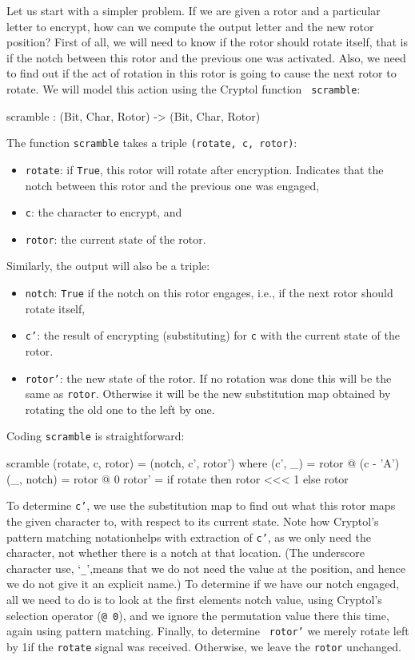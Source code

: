 Let us start with a simpler problem.  If we are given a rotor and a
particular letter to encrypt, how can we compute the output letter and
the new rotor position?  First of all, we will need to know if the
rotor should rotate itself, that is if the notch between this rotor
and the previous one was activated. Also, we need to find out if the
act of rotation in this rotor is going to cause the next rotor to
rotate. We will model this action using the Cryptol function {\tt
  scramble}:
\begin{code}
  scramble : (Bit, Char, Rotor) -> (Bit, Char, Rotor)
\end{code}
The function {\tt scramble} takes a triple \texttt{(rotate, c, rotor)}:
\begin{itemize}
\item {\tt rotate}: if {\tt True}, this rotor will rotate after
  encryption. Indicates that the notch between this rotor and the
  previous one was engaged,
  \item {\tt c}: the character to encrypt, and
  \item {\tt rotor}: the current state of the rotor.
\end{itemize}
Similarly, the output will also be a triple:
\begin{itemize}
\item {\tt notch}: {\tt True} if the notch on this rotor engages,
  i.e., if the next rotor should rotate itself,
\item {\tt c'}: the result of encrypting (substituting) for {\tt c}
  with the current state of the rotor.
\item {\tt rotor'}: the new state of the rotor. If no rotation was
  done this will be the same as {\tt rotor}. Otherwise it will be the
  new substitution map obtained by rotating the old one to the left by
  one.
\end{itemize}
Coding {\tt scramble} is straightforward:
\begin{code}
  scramble (rotate, c, rotor) = (notch, c', rotor')
    where 
      (c', _)    = rotor @ (c - 'A')
      (_, notch) = rotor @ 0
      rotor'     = if rotate then rotor <<< 1 else rotor
\end{code}
To determine {\tt c'}, we use the substitution map to find out what
this rotor maps the given character to, with respect to its current
state. Note how Cryptol's pattern matching notation\indPatMatch helps
with extraction of {\tt c'}, as we only need the character, not
whether there is a notch at that location.  (The underscore character
use, `\texttt{\_}',\indUnderscore means that we do not need the value
at the position, and hence we do not give it an explicit name.) To
determine if we have our notch engaged, all we need to do is to look
at the first elements notch value, using Cryptol's selection operator
({\tt @ 0}\indIndex), and we ignore the permutation value there this
time, again using pattern matching.  Finally, to determine {\tt
  rotor'} we merely rotate left by 1\indRotLeft if the {\tt rotate}
signal was received. Otherwise, we leave the {\tt rotor} unchanged.

